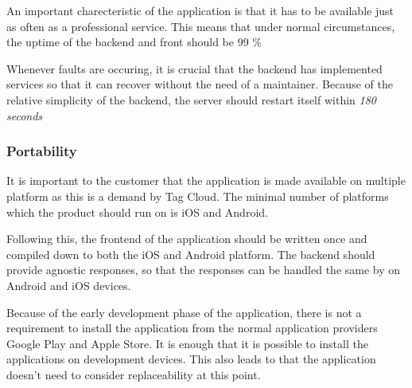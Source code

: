 An important charecteristic of the application is that it has to be available just as often as a professional service. This means that under normal circumstances, the uptime of the backend and front should be 99 \%

Whenever faults are occuring, it is crucial that the backend has implemented services so that it can recover without the need of a maintainer. Because of the relative simplicity of the backend, the server should restart itself within \textit{180 seconds}

\subsubsection{Portability}

It is important to the customer that the application is made available on multiple platform as this is a demand by Tag Cloud. The minimal number of platforms which the product should run on is iOS and Android. 

Following this, the frontend of the application should be written once and compiled down to both the iOS and Android platform. The backend should provide agnostic responses, so that the responses can be handled the same by on Android and iOS devices. 

Because of the early development phase of the application, there is not a requirement to install the application from the normal application providers Google Play and Apple Store. It is enough that it is possible to install the applications on development devices. This also leads to that the application doesn't need to consider replaceability at this point.  



